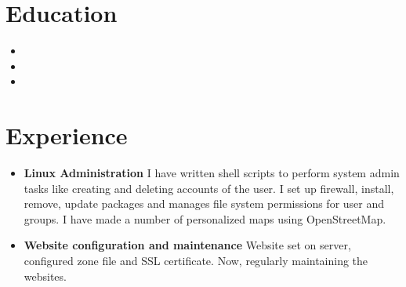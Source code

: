 \documentclass[10.1pt,a4paper,sans]{moderncv}        %
\begin{document}
\makecvtitle
\vspace{-30pt}

\section{Education}

\vspace{3pt}

\begin{itemize}

\item{}

\item{}  %

\item{}

\end{itemize}

\section{Experience}

\vspace{3pt}

\begin{itemize}


\item \textbf{Linux Administration}\newline
I have written shell scripts to perform system admin tasks like creating and deleting accounts of the user.
I set up firewall, install, remove, update packages and manages file system permissions for user and groups.
I have made a number of personalized maps using OpenStreetMap.

\vspace{3pt}

\item \textbf{Website configuration and maintenance}\newline
Website set on server, configured zone file and SSL certificate. Now, regularly maintaining the websites.

\end{itemize}
\end{document}
